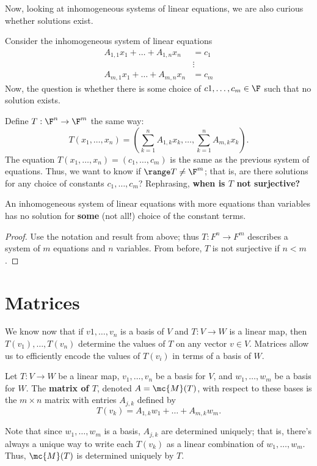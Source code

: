 \documentclass[math0540-lecture-notes.tex]{subfiles}
\begin{document}
Now, looking at inhomogeneous systems of linear equations, we are also curious whether solutions
exist.
\begin{example}
  Consider the inhomogeneous system of linear equations \begin{align*}
    A_{1,1}x_1+\ldots+A_{1,n}x_n&= c_1 \\
                                &\vdots\\
    A_{m,1}x_1+\ldots+A_{m,n}x_n&= c_m
  \end{align*}
  Now, the question is whether there is some choice of $c1,\ldots,c_m\in \F$ such that no solution
  exists.

  Define $T:\F^n\to \F^m$ the same way: \[
    T(x_1,\ldots,x_n)=\left( \sum_{k=1}^{n} A_{1,k}x_k,\ldots,\sum_{k=1}^{n} A_{m,k}x_k \right) 
  .\] The equation $T(x_1,\ldots,x_n)=(c_1,\ldots,c_m)$ is the same as the previous system of
  equations. Thus, we want to know if $ \range T \neq \F^m$; that is, are there solutions for any
  choice of constants $c_1,\ldots,c_m$? Rephrasing, \textbf{when is $T$ not surjective?} 
\end{example}

\begin{proposition}{}
  An inhomogeneous system of linear equations with more equations than variables has no solution for
  \textbf{some} (not all!) choice of the constant terms.
\end{proposition}
\begin{proof}[Proof]
  Use the notation and result from above; thus $T:F^n\to F^m$ describes a system of $m$ equations
  and $n$ variables. From before, $T$ is not surjective if $n<m$.
\end{proof}


\section{Matrices}
We know now that if $v1,\ldots,v_n$ is a basis of $V$ and $T:V\to W$ is a linear map, then
$T(v_1),\ldots,T(v_n)$ determine the values of $T$ on any vector $v\in V$. Matrices allow us to
efficiently encode the values of $T(v_i)$ in terms of a basis of $W$.

\begin{definition}{}
  Let $T:V\to W$ be a linear map, $v_1,\ldots,v_n$ be a basis for $V$, and $w_1,\ldots,w_m$ be a
  basis for $W$. The \textbf{matrix of $T$}, denoted $A=\mc{M}(T)$, with respect to these bases is the
  $m\times n$ matrix with entries $A_{j,k}$ defined by \[
    T(v_k)=A_{1,k}w_1+\ldots+A_{m,k}w_m
  .\] 
\end{definition}
\begin{remark}
  Note that since $w_1,\ldots,w_m$ is a basis, $A_{j,k}$ are determined uniquely; that is, there's
  always a unique way to write each $T(v_k)$ as a linear combination of $ w_1,\ldots,w_m$. Thus,
  $\mc{M}(T)$ is determined uniquely by $T$.
\end{remark}
\end{document}
